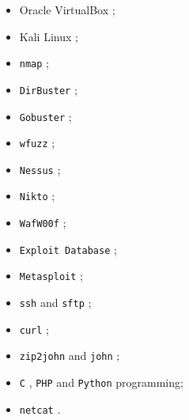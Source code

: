 \begin{itemize}
	\item Oracle VirtualBox \cite{virtualbox};
	\item Kali Linux \cite{kali};
	\item \texttt{nmap} \cite{nmap};
	\item \texttt{DirBuster} \cite{dirbuster};
	\item \texttt{Gobuster} \cite{gobuster};
	\item \texttt{wfuzz} \cite{wfuzz};
	\item \texttt{Nessus} \cite{nessus};
	\item \texttt{Nikto} \cite{nikto};
	\item \texttt{WafW00f} \cite{wafwoof};
	\item \texttt{Exploit Database} \cite{exploitdb};
	\item \texttt{Metasploit} \cite{metasploitMetasploitPenetration};
	\item \texttt{ssh} and \texttt{sftp} \cite{ssh};
	\item \texttt{curl} \cite{curl};
	\item \texttt{zip2john} and \texttt{john} \cite{john};
	\item \texttt{C} \cite{c}, \texttt{PHP} \cite{php} and \texttt{Python} \cite{python} programming;
	\item \texttt{netcat} \cite{netcat}.
\end{itemize}




